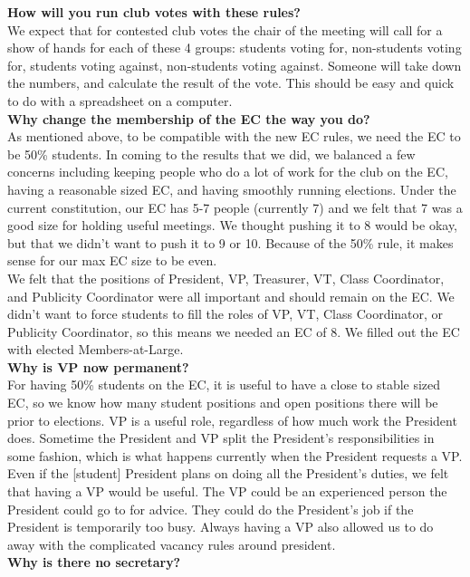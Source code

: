 \documentclass{article}
\begin{document}
\textbf{How will you run club votes with these rules?}\\\smallskip
We expect that for contested club votes the chair of the meeting will call for a show of hands for each of these 4 groups: students voting for, non-students voting for, students voting against, non-students voting against. Someone will take down the numbers, and calculate the result of the vote. This should be easy and quick to do with a spreadsheet on a computer. \\\bigskip
\textbf{Why change the membership of the EC the way you do?}\\\smallskip
As mentioned above, to be compatible with the new EC rules, we need the EC to be 50\% students. In coming to the results that we did, we balanced a few concerns including keeping people who do a lot of work for the club on the EC, having a reasonable sized EC, and having smoothly running elections. Under the current constitution, our EC has 5-7 people (currently 7) and we felt that 7 was a good size for holding useful meetings. We thought pushing it to 8 would be okay, but that we didn't want to push it to 9 or 10. Because of the 50\% rule, it makes sense for our max EC size to be even. \\ We felt that the positions of President, VP, Treasurer, VT, Class Coordinator, and Publicity Coordinator were all important and should remain on the EC. We didn't want to force students to fill the roles of VP, VT, Class Coordinator, or Publicity Coordinator, so this means we needed an EC of 8. We filled out the EC with elected  Members-at-Large. \\\bigskip
\textbf{Why is VP now permanent?}\\\smallskip
 For having 50\% students on the EC, it is useful to have a close to stable sized EC, so we know how many student positions and open positions there will be prior to elections. VP is a useful role, regardless of how much work the President does. Sometime the President and VP split the President's responsibilities in some fashion, which is what happens currently when the President requests a VP. Even if the [student] President plans on doing all the President's duties, we felt that having a  VP would be useful. The VP could be an experienced person the President could go to for advice. They could do the President's job if the President is temporarily too busy. Always having a VP also allowed us to do away with the complicated vacancy rules around president.\\\bigskip
 \textbf{Why is there no secretary?}\\\smallskip
\end{document}
